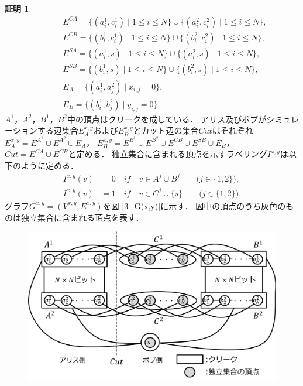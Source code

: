 \documentclass[12pt]{thesis}
\theoremstyle{definition}
\newtheorem*{prf*}{証明}
\begin{document}
\begin{prf*}
\begin{align*}
&\phantom{=} \quad E^{CA} = \{(a^{1}_{i}, c^{1}_{i}) \mid 1\leq i \leq N\} \cup \{(a^{2}_{i}, c^{2}_{i}) \mid 1\leq i \leq N\}, \\
&\phantom{=} \quad E^{CB} = \{(b^{1}_{i}, c^{1}_{i}) \mid 1\leq i \leq N\} \cup \{(b^{2}_{i}, c^{2}_{i}) \mid 1\leq i \leq N\}, \\
&\phantom{=} \quad E^{SA} = \{(a^{1}_{i}, s) \mid 1\leq i \leq N\} \cup \{(a^{2}_{i}, s) \mid 1\leq i \leq N\}, \\
&\phantom{=} \quad E^{SB} = \{(b^{1}_{i}, s) \mid 1\leq i \leq N\} \cup \{(b^{2}_{i}, s) \mid 1\leq i \leq N\}, \\
&\phantom{=} \quad E_{A} = \{(a^{1}_{i},a^{2}_{j}) \mid x_{i,j}=0\}, \\
&\phantom{=} \quad E_{B} = \{(b^{1}_{i},b^{2}_{j}) \mid y_{i,j}=0\}.
\end{align*}
$A^{1}$，$A^{2}$，$B^{1}$，$B^{2}$中の頂点はクリークを成している．
アリス及びボブがシミュレーションする辺集合$E^{x,y}_A$および$E^{x,y}_B$とカット辺の集合$\mathit{Cut}$はそれぞれ
$E^{x,y}_{A} = E^{A^{1}} \cup E^{A^{2}} \cup E_{A}$，
$E^{x,y}_{B} = E^{B^{1}} \cup E^{B^{2}} \cup E^{CB} \cup E^{SB} \cup E_{B}$，
$\mathit{Cut} = E^{CA} \cup E^{CB}$と定める．
独立集合に含まれる頂点を示すラベリング$I^{x,y}$は以下のように定める．
\begin{align*}
I^{x,y}(v) &= 0 \quad if \quad v \in A^{j} \cup B^{j} \quad \quad \text{($j \in \{1, 2\}$)}, \\
I^{x,y}(v) &= 1 \quad if \quad v \in C^{j} \cup \{s\} \quad \quad \text{($j \in \{1, 2\}$)}.
\end{align*}
グラフ$G^{x, y} = (V^{x,y}, E^{x,y})$を図 \ref{3_G(x,y)}に示す．
図中の頂点のうち灰色のものは独立集合に含まれる頂点を表す．
\begin{figure}[ht]
\begin{center}
\includegraphics[width=120mm]{3_Gxy.png}

\end{center}
\end{figure}
\end{prf*}
\end{document}
